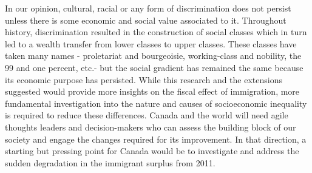 \vspace{0.7em}\par
In our opinion, cultural, racial or any form of discrimination does not persist unless there is some economic and social value associated to it.
Throughout history, discrimination resulted in the construction of social classes which in turn led to a wealth transfer from lower classes to upper classes.
These classes have taken many names - proletariat and bourgeoisie, working-class and nobility, the 99 and one percent, etc.- but the social gradient has remained the same because its economic purpose has persisted.
While this research and the extensions suggested would provide more insights on the fiscal effect of immigration, more fundamental investigation into the nature and causes of socioeconomic inequality is required to reduce these differences.
Canada and the world will need agile thoughts leaders and decision-makers who can assess the building block of our society and engage the changes required for its improvement.
In that direction, a starting but pressing point for Canada would be to investigate and address the sudden degradation in the immigrant surplus from 2011.
